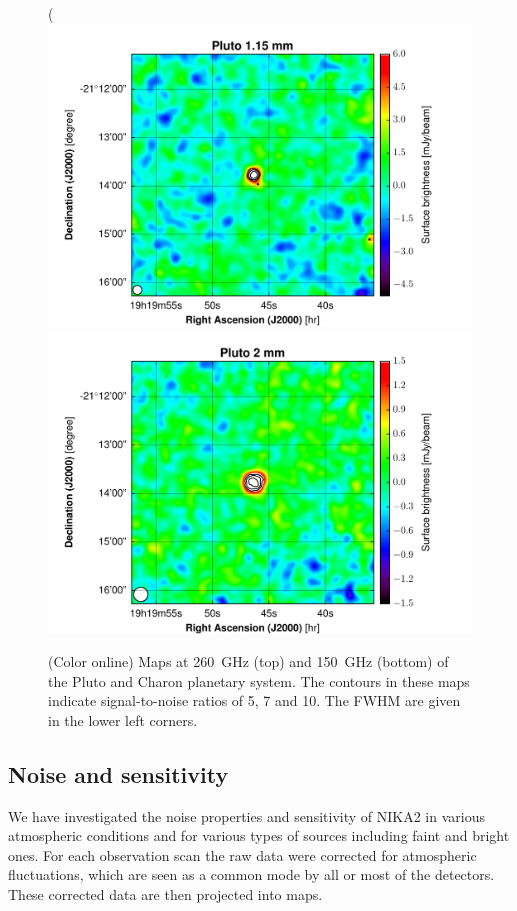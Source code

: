 \documentclass[]{aa} %
\begin{document}
\begin{figure}[h]
   \centering(
        \includegraphics[width=.75\linewidth]{Pluto_1mm_map_snrcont.pdf}
    \includegraphics[width=.75\linewidth]{Pluto_2mm_map_snrcont.pdf}
      \caption{(Color online) Maps at 260~GHz (top) and 150~GHz (bottom) of the Pluto and Charon planetary system. The contours in these maps indicate signal-to-noise ratios of 5, 7 and 10. The FWHM are given in the lower left corners.
         \label{fig_compact_sources2}}
\end{figure}




\subsection{Noise and sensitivity}
\label{Noise and sensitivity}

We have investigated the noise properties and sensitivity of NIKA2 in various atmospheric conditions and for various types of sources including faint and bright ones. For each observation scan the raw data were corrected for atmospheric fluctuations, which are seen as a common mode by all or most of the detectors. These corrected data are then projected into maps.
\end{document}
